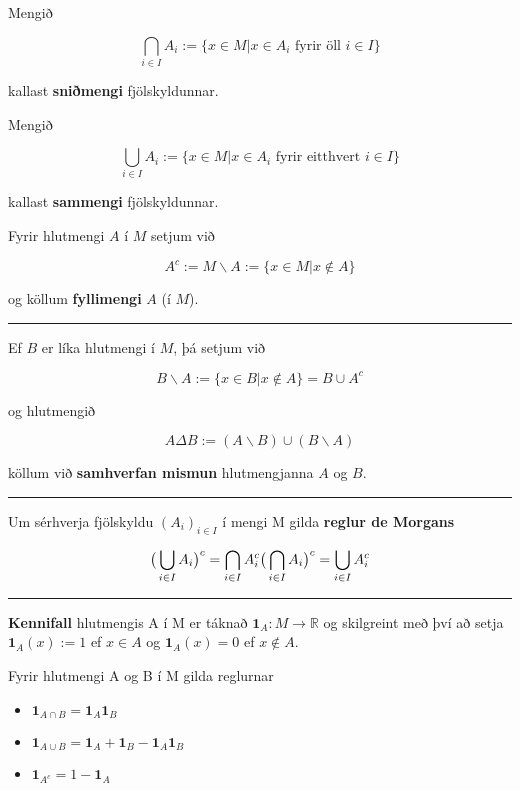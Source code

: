 \documentclass[]{book}
\begin{document}
Mengið

\[
\bigcap_{i\in I}A_i := \{x\in M| x \in A_i \text{ fyrir öll } i\in I\}
\]

kallast \textbf{sniðmengi} fjölskyldunnar.

Mengið

\[
\bigcup_{i\in I}A_i := \{x\in M| x \in A_i \text{ fyrir eitthvert } i\in I\}
\]

kallast \textbf{sammengi} fjölskyldunnar.

Fyrir hlutmengi \(A\) í \(M\) setjum við

\[
A^c := M\backslash A := \{x \in M | x \notin A\}
\]

og köllum \textbf{fyllimengi} \(A\) (í \(M\)).

\begin{center}\rule{0.5\linewidth}{\linethickness}\end{center}

Ef \(B\) er líka hlutmengi í \(M\), þá setjum við

\[
B\backslash A := \{x \in B| x \notin A\} = B \cup A^c
\]

og hlutmengið

\[
A\Delta B := (A\backslash B) \cup (B\backslash A)
\]

köllum við \textbf{samhverfan mismun} hlutmengjanna \(A\) og \(B\).

\begin{center}\rule{0.5\linewidth}{\linethickness}\end{center}

Um sérhverja fjölskyldu \((A_i)_{i\in I}\) í mengi M gilda \textbf{reglur de Morgans}

\[
\big(\bigcup_{i\in I} A_i\big)^c = \bigcap_{i\in I}A_i^c \\
\big(\bigcap_{i\in I} A_i\big)^c = \bigcup_{i\in I}A_i^c
\]

\begin{center}\rule{0.5\linewidth}{\linethickness}\end{center}

\textbf{Kennifall} hlutmengis A í M er táknað \(\mathbf 1_A: M \rightarrow \mathbb R\) og skilgreint með því að setja \(\mathbf 1_A(x) := 1\) ef \(x\in A\) og \(\mathbf 1_A(x) = 0\) ef \(x \notin A\).

Fyrir hlutmengi A og B í M gilda reglurnar

\begin{itemize}
\item
  \(\mathbf 1_{A\cap B} = \mathbf 1_A \mathbf 1_B\)
\item
  \(\mathbf 1_{A\cup B} = \mathbf 1_A + \mathbf 1_B - \mathbf 1_A\mathbf 1_B\)
\item
  \(\mathbf 1_{A^c} = 1 - \mathbf 1_A\)
\end{itemize}
\end{document}
